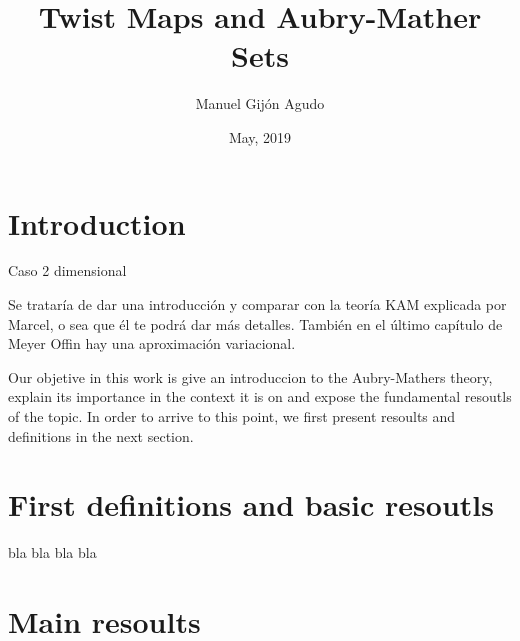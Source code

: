 \documentclass{article}
\title{Twist Maps and Aubry-Mather Sets}
\author{Manuel Gijón Agudo }
\date{May, 2019}
\begin{document}
	\begin{titlepage}
		\maketitle{} 
	\end{titlepage}
	
	\newpage
	\tableofcontents
	\newpage
	

\section{Introduction}

	
	
	Caso 2 dimensional
	
	Se trataría de dar una introducción y comparar con la teoría KAM explicada por Marcel, o sea que él te podrá dar más detalles.
También en el último capítulo de Meyer Offin hay una aproximación variacional. 


		
	Our objetive in this work is give an introduccion to the Aubry-Mathers theory, explain its importance in the context it is on and expose the fundamental resoutls of the topic. In order to arrive to this point, we first present resoults and definitions in the next section.
		
		
		
	

	
		
	


\section{First definitions and basic resoutls}
		
\noindent bla bla bla bla
		
		
		
\section{Main resoults}
		
\end{document}
